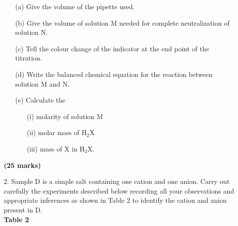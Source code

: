 \begin{enumerate}
\begin{enumerate}
\item[(a)] Give the volume of the pipette used.
\item[(b)] Give the volume of solution M needed for complete neutralization of solution N.
\item[(c)] Tell the colour change of the indicator at the end point of the titration.
\item[(d)] Write the balanced chemical equation for the reaction between solution M and N.
\item[(e)] Calculate the
\begin{enumerate}
\item[(i)] molarity of solution M
\item[(ii)] molar mass of H$_2$X
\item[(iii)] mass of X in H$_2$X.
\end{enumerate}
\end{enumerate}

\raggedleft \textbf{(25 marks)}\newpage

\raggedright

\item[2.] Sample D is a simple salt containing one cation and one anion. Carry out carefully the experiments described below recording all your observations and appropriate inferences as shown in Table 2 to identify the cation and anion present in D.\\
\vspace{10pt}
\textbf{Table 2}\\


\end{enumerate}
